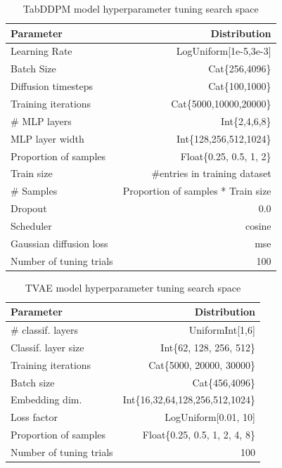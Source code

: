 \begin{table}[h]
	\centering
	\begin{tabular}{lr}
		\toprule
		Parameter               & Distribution                       \\
		\midrule
		Learning Rate           & LogUniform[1e-5,3e-3]              \\
		Batch Size              & Cat\{256,4096\}                    \\
		Diffusion timesteps     & Cat\{100,1000\}                    \\
		Training iterations     & Cat\{5000,10000,20000\}            \\
		\# MLP layers           & Int\{2,4,6,8\}                     \\
		MLP layer width         & Int\{128,256,512,1024\}            \\
		Proportion of samples   & Float\{0.25, 0.5, 1, 2\}           \\
		\midrule
		Train size              & \#entries in training dataset      \\
		\# Samples              & Proportion of samples * Train size \\
		Dropout                 & 0.0                                \\
		Scheduler               & cosine                             \\
		Gaussian diffusion loss & mse                                \\
		\midrule
		Number of tuning trials & 100                                \\
		\bottomrule
	\end{tabular}
	\caption[TabDDPM Hyperparameter Search Space]{TabDDPM model hyperparameter tuning search space}
	\label{tab:diff_tune}
\end{table}



\begin{table}[h]
	\centering
	\begin{tabular}{lr}
		\toprule
		Parameter               & Distribution                     \\
		\midrule
		\# classif. layers      & UniformInt[1,6]                  \\
		Classif. layer size     & Int\{62, 128, 256, 512\}         \\
		Training iterations    & Cat\{5000, 20000, 30000\}        \\
		Batch size              & Cat\{456,4096\}                  \\
		Embedding dim.          & Int\{16,32,64,128,256,512,1024\} \\
		Loss factor             & LogUniform[0.01, 10]             \\
		Proportion of samples   & Float\{0.25, 0.5, 1, 2, 4, 8\}   \\
		\midrule
		Number of tuning trials & 100                              \\
		\bottomrule
	\end{tabular}
	\caption[TVAE Hyperparameter Search Space]{TVAE model hyperparameter tuning search space}
	\label{tab:tvae_tune}

\end{table}

